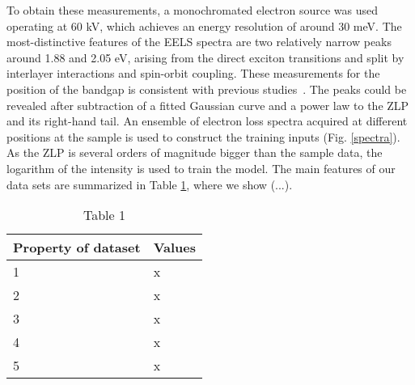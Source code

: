 To obtain these measurements,
a monochromated electron source was used operating at 60 kV, which achieves an energy resolution of around 30 meV. The most-distinctive features of the EELS spectra are two relatively narrow peaks around 1.88 and 2.05 eV, arising from the direct exciton transitions and split by interlayer interactions and spin-orbit coupling. These measurements for the position of the bandgap is consistent with previous studies~\cite{Nerl:2016, Komsa:2012}. The peaks could be revealed after subtraction of a fitted Gaussian curve and a power law to the ZLP and its right-hand tail. 
%
An ensemble of electron loss spectra acquired at different positions at the sample is used to construct the training inputs (Fig. \ref{spectra}). As the ZLP is several orders of magnitude bigger than the sample data, the logarithm of the intensity is used to train the model.
%
The main features of our data sets are summarized in Table \ref{table:spectra}, where we show (...). 

\begin{table}[H]
\centering
\begin{tabular}{|l|l|}
\hline
Property of dataset & Values \\ \hline
1                   & x      \\ \hline
2                   & x      \\ \hline
3                   & x      \\ \hline
4                   & x      \\ \hline
5                   & x      \\ \hline
\end{tabular}
\caption{Table 1}
\label{table:spectra}
\end{table}
